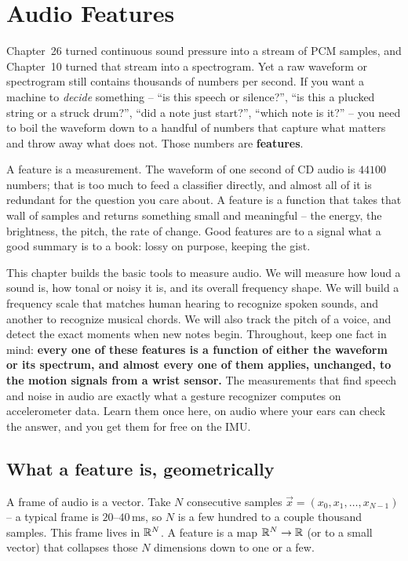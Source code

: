 \chapter{Audio Features}

Chapter~26 turned continuous sound pressure into a stream of PCM samples, and Chapter~10
turned that stream into a spectrogram. Yet a raw waveform or spectrogram still contains
thousands of numbers per second. If you want a
machine to \emph{decide} something -- ``is this speech or silence?'', ``is this a
plucked string or a struck drum?'', ``did a note just start?'', ``which note is
it?'' -- you need to boil the waveform down to a handful of
numbers that capture what matters and throw away what does not. Those numbers are
\textbf{features}.

A feature is a measurement. The waveform of one second of CD audio is
$44100$ numbers; that is too much to feed a classifier directly, and almost
all of it is redundant for the question you care about. A
feature is a function that takes that wall of samples and returns something small
and meaningful -- the energy, the brightness, the pitch, the rate of change. Good
features are to a signal what a good summary is to a book: lossy on purpose,
keeping the gist.

This chapter builds the basic tools to measure audio. We will measure how loud a sound is, how tonal or noisy it is, and its overall frequency shape. We will build a frequency scale that matches human hearing to recognize spoken sounds, and another to recognize musical chords. We will also track the pitch of a voice, and detect the exact moments when new notes begin. Throughout, keep one fact in mind: \textbf{every one of these features is
a function of either the waveform or its spectrum, and almost every one of them
applies, unchanged, to the motion signals from a wrist sensor.} The measurements that find speech and noise in audio are exactly what a gesture
recognizer computes on accelerometer data. Learn them once here, on audio where
your ears can check the answer, and you get them for free on the IMU.

\chapterline

\section{What a feature is, geometrically}
\label{ch27:what-is-a-feature}

A frame of audio is a vector. Take $N$ consecutive samples
$\vec{x} = (x_0, x_1, \dots, x_{N-1})$ -- a typical frame is $20$--$40$\,ms, so
$N$ is a few hundred to a couple thousand samples. This frame lives in $\mathbb{R}^N$.
A feature is a map $\mathbb{R}^N \to \mathbb{R}$ (or to a small vector) that collapses those $N$
dimensions down to one or a few.

